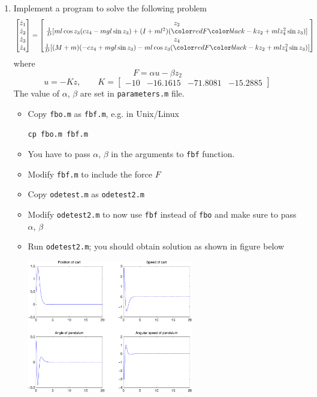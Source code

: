 \documentclass[11pt,xcolor=svgnames,onlymath]{beamer}
\begin{document}
\begin{frame}
\begin{enumerate}
\item Implement a program to solve the following problem
{\footnotesize
\[
\begin{bmatrix}
\dz_1 \\ \dz_2 \\ \dz_3 \\ \dz_4 \end{bmatrix} = \begin{bmatrix}
z_2 \\
\frac{1}{D} [ m l \cos z_3 (c z_4 - mgl\sin z_3) + (I+ml^2)(\clr{red}{F} - k z_2 + ml      z_4^2 \sin      z_3)] \\
z_4 \\
\frac{1}{D}[ (M+m)(-c z_4 + mgl\sin z_3) - ml\cos z_3 (\clr{red}{F} - k z_2 + ml z_4^2     \sin z_3)]
\end{bmatrix}
\]
}
where
\[
F = \alpha u - \beta z_2
\]
\[
u = -Kz, \qquad K = \begin{bmatrix}
-10 & -16.1615 & -71.8081 & -15.2885 \end{bmatrix}
\]
The value of $\alpha$, $\beta$ are set in {\tt parameters.m} file.
\begin{itemize}

\item Copy {\tt fbo.m} as {\tt fbf.m}, e.g. in Unix/Linux\\
\begin{center}
{\tt cp fbo.m fbf.m}
\end{center}

\item You have to pass $\alpha$, $\beta$ in the arguments to {\tt fbf} function.

\item Modify {\tt fbf.m} to include the force $F$

\item Copy {\tt odetest.m} as {\tt odetest2.m}

\item Modify {\tt odetest2.m} to now use {\tt fbf} instead of {\tt fbo} and make sure to pass $\alpha$, $\beta$

\item Run {\tt odetest2.m}; you should obtain solution as shown in figure below
\begin{center}
\includegraphics[width=0.6\textwidth]{odetest2}
\end{center}


\end{itemize}
\end{enumerate}
\end{frame}
\end{document}
